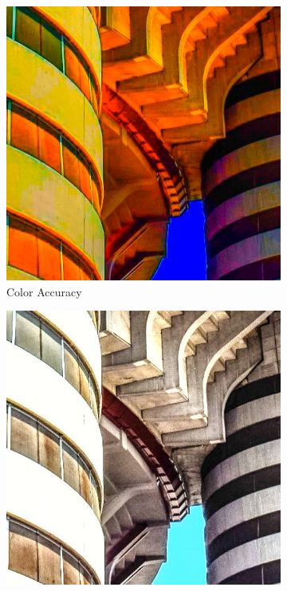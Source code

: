 \begin{figure}[ht]
    \begin{subfigure}[b]{0.24\textwidth}
        \includegraphics[width=\textwidth]{img/ColorAccuracy.jpg}
        \caption{Color Accuracy}
        \label{fig:color_accuracy}
    \end{subfigure}
    \hfill
    \begin{subfigure}[b]{0.24\textwidth}
        \includegraphics[width=\textwidth]{img/BrightnessContrast.jpg}

\end{subfigure}
\end{figure}
